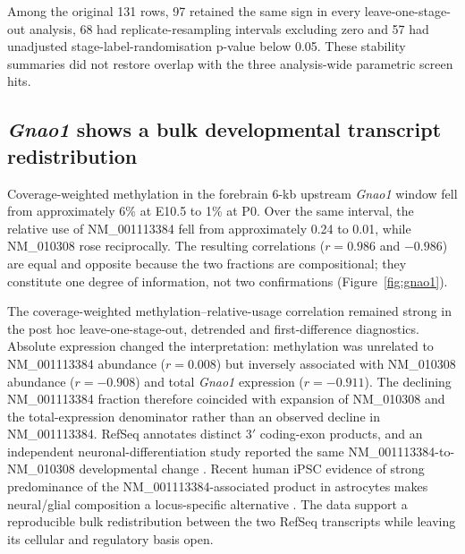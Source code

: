 \documentclass[11pt,a4paper]{article}
\begin{document}
Among the original 131 rows, 97 retained the same sign in every leave-one-stage-out analysis, 68 had replicate-resampling intervals excluding zero and 57 had unadjusted stage-label-randomisation p-value below 0.05. These stability summaries did not restore overlap with the three analysis-wide parametric screen hits.

\subsection{\textit{Gnao1} shows a bulk developmental transcript redistribution}

Coverage-weighted methylation in the forebrain 6-kb upstream \textit{Gnao1} window fell from approximately 6\% at E10.5 to 1\% at P0. Over the same interval, the relative use of NM\_001113384 fell from approximately 0.24 to 0.01, while NM\_010308 rose reciprocally. The resulting correlations ($r=0.986$ and $-0.986$) are equal and opposite because the two fractions are compositional; they constitute one degree of information, not two confirmations (Figure~\ref{fig:gnao1}).

The coverage-weighted methylation--relative-usage correlation remained strong in the post hoc leave-one-stage-out, detrended and first-difference diagnostics. Absolute expression changed the interpretation: methylation was unrelated to NM\_001113384 abundance ($r=0.008$) but inversely associated with NM\_010308 abundance ($r=-0.908$) and total \textit{Gnao1} expression ($r=-0.911$). The declining NM\_001113384 fraction therefore coincided with expansion of NM\_010308 and the total-expression denominator rather than an observed decline in NM\_001113384. RefSeq annotates distinct 3$'$ coding-exon products, and an independent neuronal-differentiation study reported the same NM\_001113384-to-NM\_010308 developmental change \citep{ncbiGnao1,suzuki2011gnao1}. Recent human iPSC evidence of strong predominance of the NM\_001113384-associated product in astrocytes makes neural/glial composition a locus-specific alternative \citep{volovikov_gnao1_2025}. The data support a reproducible bulk redistribution between the two RefSeq transcripts while leaving its cellular and regulatory basis open.
\end{document}
